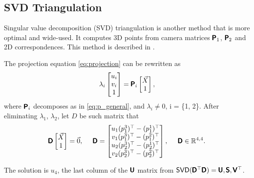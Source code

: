 \subsection{SVD Triangulation}
\label{sec:svdtriang}
Singular value decomposition (SVD) triangulation is another method that is more optimal and wide-used.
It computes 3D points from camera matrices $\pmb{\mathsf{P}}_1$, $\pmb{\mathsf{P}}_2$ and 2D correspondences. 
This method is described in \cite{hartley_zisserman_2004}.

The projection equation \eqref{eq:projection} can be rewritten as
\begin{equation}
    \lambda_i \begin{bmatrix} 
        u_i \\ v_i \\ 1 \end{bmatrix} = \pmb{\mathsf{P}}_i
    \begin{bmatrix} \vec{X} \\ 1
    \end{bmatrix},
\end{equation} 
where $\pmb{\mathsf{P}}_i$ decomposes as in \eqref{eq:p_general}, and $\lambda_i \neq 0$, i = \{1, 2\}.
After eliminating $\lambda_1$, $\lambda_2$, let $D$ be such matrix that
\begin{equation}
    \pmb{\mathsf{D}} \begin{bmatrix} \vec{X} \\ 1 \end{bmatrix} = \vec{0}, \;\;\;\;\;
    \pmb{\mathsf{D}} = \begin{bmatrix}
        u_1 (p_1^3)^\top - (p_1^1)^\top \\
        v_1 (p_1^3)^\top - (p_1^2)^\top \\
        u_2 (p_2^3)^\top - (p_2^1)^\top \\
        v_2 (p_2^3)^\top - (p_2^2)^\top \\
    \end{bmatrix}, \;\;\;\;\; \pmb{\mathsf{D}} \in \mathbb{R}^{4, 4}.
\end{equation}

The solution is $u_4$, the last column of the $\pmb{\mathsf{U}}$ matrix from $\mathsf{SVD}(\pmb{\mathsf{D}}^\top \pmb{\mathsf{D}}) = \pmb{\mathsf{U}}, \pmb{\mathsf{S}}, \pmb{\mathsf{V}}^\top$.



